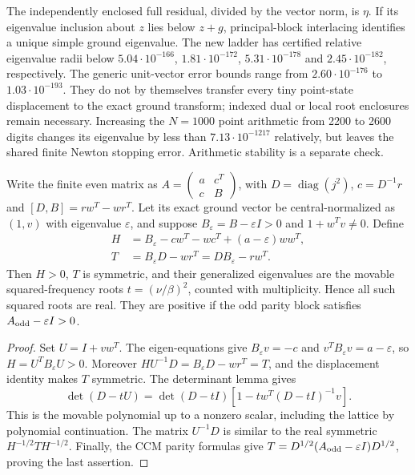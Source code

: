 The independently enclosed full residual, divided by the vector norm,
is $\eta$. If its eigenvalue inclusion about $z$ lies below $z+g$,
principal-block interlacing identifies a unique simple ground eigenvalue.
The new ladder has certified relative eigenvalue radii below
$5.04\cdot10^{-166}$, $1.81\cdot10^{-172}$,
$5.31\cdot10^{-178}$ and $2.45\cdot10^{-182}$, respectively.
The generic unit-vector error bounds range from $2.60\cdot10^{-176}$
to $1.03\cdot10^{-193}$. They do not by themselves transfer every tiny
point-state displacement to the exact ground transform; indexed dual
or local root enclosures remain necessary. Increasing the $N=1000$
point arithmetic from 2200 to 2600 digits changes its eigenvalue by
less than $7.13\cdot10^{-1217}$ relatively, but leaves the shared
finite Newton stopping error. Arithmetic stability is a separate check.

\begin{proposition}
\label{prop:movable-symmetric-pencil}
Write the finite even matrix as $A=\left(\begin{smallmatrix}a&c^T\\c&B\end{smallmatrix}\right)$,
with $D=\operatorname{diag}(j^2)$, $c=D^{-1}r$ and
$[D,B]=rw^T-wr^T$. Let its exact ground vector be central-normalized
as $(1,v)$ with eigenvalue $\varepsilon$, and suppose
$B_\varepsilon=B-\varepsilon I>0$ and $1+w^Tv\ne0$.
Define
\begin{align}
 H&=B_\varepsilon-cw^T-wc^T+(a-\varepsilon)ww^T,
 \label{eq:movable-pencil-H}\\
 T&=B_\varepsilon D-wr^T=DB_\varepsilon-rw^T.
 \label{eq:movable-pencil-T}
\end{align}
Then $H>0$, $T$ is symmetric, and their generalized eigenvalues are
the movable squared-frequency roots $t=(\nu/\beta)^2$, counted with
multiplicity. Hence all such squared roots are real. They are positive
if the odd parity block satisfies $A_{\rm odd}-\varepsilon I>0$.
\end{proposition}
\begin{proof}
Set $U=I+vw^T$. The eigen-equations give $B_\varepsilon v=-c$ and
$v^TB_\varepsilon v=a-\varepsilon$, so $H=U^TB_\varepsilon U>0$.
Moreover $HU^{-1}D=B_\varepsilon D-wr^T=T$, and the displacement
identity makes $T$ symmetric. The determinant lemma gives
\[
 \det(D-tU)=\det(D-tI)
       [1-tw^T(D-tI)^{-1}v].
\]
This is the movable polynomial up to a nonzero scalar, including the
lattice by polynomial continuation. The matrix $U^{-1}D$ is similar
to the real symmetric $H^{-1/2}TH^{-1/2}$. Finally, the CCM parity
formulas give $T=D^{1/2}(A_{\rm odd}-\varepsilon I)D^{1/2}$, proving
the last assertion.
\end{proof}

